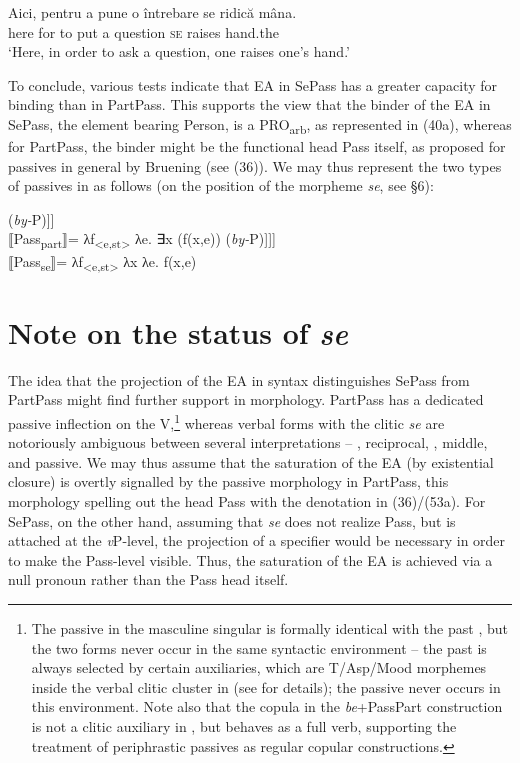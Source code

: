 \documentclass[output=paper]{langsci/langscibook}
\begin{document}
\ea%
    \label{ex:giurgea:52}
    \gll Aici, pentru a pune o întrebare se ridică mâna.   \\
         here  for     to put   a question  \textsc{se} raises hand.the\\
    \glt ‘Here, in order to ask a question, one raises one’s hand.’
\z

To conclude, various tests indicate that EA in SePass has a greater capacity for binding than in PartPass. This supports the view that the binder of the EA in SePass, the element bearing Person, is a PRO\textsubscript{arb}, as represented in (40a), whereas for PartPass, the binder might be the functional head Pass itself, as proposed for passives in general by Bruening (see (36)). We may thus represent the two types of passives in  as follows (on the position of the morpheme \textit{se}, see §6):

\ea%
    \label{ex:giurgea:53}
    \ea\relax [\textsubscript{PassPartP} Pass\textsubscript{Part} [\textit{\textsubscript{v}}\textsubscript{P} \textit{v} [\textsubscript{VP} V IA] (\textit{by-}P)]]\\⟦Pass\textsubscript{part}⟧= λf\textsubscript{<e,st>} λe. ∃x (f(x,e))
    \ex\relax [\textsubscript{PassSeP} PRO\textsubscript{arb} [Pass\textsubscript{se} [\textit{\textsubscript{v}}\textsubscript{P} \textit{v} [\textsubscript{VP} V IA] (\textit{by-}P)]]]\\⟦Pass\textsubscript{se}⟧=  λf\textsubscript{<e,st>} λx λe. f(x,e) 
    \z
\z

\section{Note on the status of \textit{se}}%
The idea that the projection of the EA in syntax distinguishes SePass from PartPass might find further support in morphology. PartPass has a dedicated passive inflection on the V,\footnote{The passive  in the masculine singular is formally identical with the past , but the two forms never occur in the same syntactic environment – the past  is always selected by certain auxiliaries, which are T\slash Asp\slash Mood morphemes inside the verbal clitic cluster in  (see \citet{Dobrovie-Sorin1994} for details); the passive  never occurs in this environment. Note also that the copula in the \textit{be}+PassPart construction is not a clitic auxiliary in , but behaves as a full verb, supporting the treatment of periphrastic passives as regular copular constructions.}  whereas verbal forms with the clitic \textit{se} are notoriously ambiguous between several interpretations – , reciprocal, , middle, and passive. We may thus assume that the saturation of the EA (by existential closure) is overtly signalled by the passive morphology in PartPass, this morphology spelling out the head Pass with the denotation in (36)/(53a). For SePass, on the other hand, assuming that \textit{se} does not realize Pass, but is attached at the \textit{v}P-level, the projection of a specifier would be necessary in order to make the Pass-level visible. Thus, the saturation of the EA is achieved via a null pronoun rather than the Pass head itself.
\end{document}
